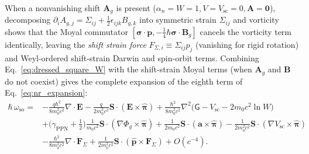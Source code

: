 \documentclass[aps,prd,onecolumn,tightenlines,nofootinbib,notitlepage,10pt,floatfix]{revtex4-2}
\theoremstyle{indentedtheorem}
\begin{document}
When a nonvanishing shift $\mathbf{A}_g$ is present ($\alpha_n=W=1,V=V_\text{sc}=0,\mathbf{A}=\mathbf{0}$), decomposing $\partial_i A_{g,j}=\Sigma_{ij}+\tfrac{1}{2}\epsilon_{ijk}B_{g,k}$ into symmetric strain $\Sigma_{ij}$ and vorticity shows that the Moyal commutator $[\boldsymbol{\sigma}\cdot\mathbf{p},-\tfrac{1}{4}\hbar\boldsymbol{\sigma}\cdot\mathbf{B}_g]$ cancels the vorticity term identically, leaving the \emph{shift strain force} $F_{\Sigma,i}\equiv\Sigma_{ij}p_j$ (vanishing for rigid rotation) and Weyl-ordered shift-strain Darwin and spin-orbit terms. Combining Eq.~\eqref{eq:dressed_square_W} with the shift-strain Moyal terms (when $\mathbf{A}_g$ and $\mathbf{B}$ do not coexist) gives the complete expansion of the eighth term of Eq.~\eqref{eq:nr_expansion}:
\begin{equation}
    \begin{aligned}
    \hbar\,\omega_\text{so} = {} & -\frac{q\hbar^2}{8m_0^2 c^2}\nabla\cdot\mathbf{E} - \frac{q}{2m_0^2 c^2}\mathbf{S}\cdot(\mathbf{E}\times\hat{\boldsymbol{\pi}}) + \frac{\hbar^2}{8m_0^2 c^2}\nabla^2\big(\mathsf{G}-V_\text{sc}-2m_0 c^2\ln W\big) \\
    & + \big(\gamma_\text{PPN}+\tfrac{1}{2}\big)\frac{1}{m_0 c^2}\mathbf{S}\cdot(\nabla\Phi_g\times\hat{\boldsymbol{\pi}}) + \frac{1}{2m_0 c^2}\mathbf{S}\cdot(\mathbf{a}\times\hat{\boldsymbol{\pi}}) - \frac{1}{2m_0^2 c^2}\mathbf{S}\cdot(\nabla V_\text{sc}\times\hat{\boldsymbol{\pi}}) \\
    & - \frac{\hbar^2}{8m_0^2 c^2}\nabla\cdot\mathbf{F}_\Sigma + \frac{1}{2m_0^2 c^2}\mathbf{S}\cdot(\hat{\mathbf{p}}\times\mathbf{F}_\Sigma) + O(c^{-4}) .
    \end{aligned}
    \label{eq:so_expanded}
\end{equation}
\end{document}
